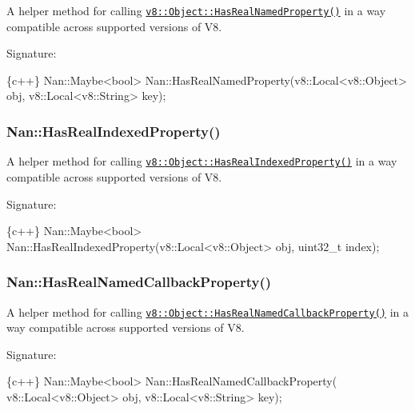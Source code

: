 A helper method for calling \href{https://v8docs.nodesource.com/io.js-3.0/db/d85/classv8_1_1_object.html#ad8b80a59c9eb3c1e6c3cd6c84571f767}{\tt {\ttfamily v8\+::\+Object\+::\+Has\+Real\+Named\+Property()}} in a way compatible across supported versions of V8.

Signature\+:


\begin{DoxyCode}
\{c++\}
Nan::Maybe<bool> Nan::HasRealNamedProperty(v8::Local<v8::Object> obj,
                                           v8::Local<v8::String> key);
\end{DoxyCode}


\label{_api_nan_has_real_indexed_property}%
 \subsubsection*{Nan\+::\+Has\+Real\+Indexed\+Property()}

A helper method for calling \href{https://v8docs.nodesource.com/io.js-3.0/db/d85/classv8_1_1_object.html#af94fc1135a5e74a2193fb72c3a1b9855}{\tt {\ttfamily v8\+::\+Object\+::\+Has\+Real\+Indexed\+Property()}} in a way compatible across supported versions of V8.

Signature\+:


\begin{DoxyCode}
\{c++\}
Nan::Maybe<bool> Nan::HasRealIndexedProperty(v8::Local<v8::Object> obj,
                                             uint32\_t index);
\end{DoxyCode}


\label{_api_nan_has_real_named_callback_property}%
 \subsubsection*{Nan\+::\+Has\+Real\+Named\+Callback\+Property()}

A helper method for calling \href{https://v8docs.nodesource.com/io.js-3.0/db/d85/classv8_1_1_object.html#af743b7ea132b89f84d34d164d0668811}{\tt {\ttfamily v8\+::\+Object\+::\+Has\+Real\+Named\+Callback\+Property()}} in a way compatible across supported versions of V8.

Signature\+:


\begin{DoxyCode}
\{c++\}
Nan::Maybe<bool> Nan::HasRealNamedCallbackProperty(
    v8::Local<v8::Object> obj,
    v8::Local<v8::String> key);
\end{DoxyCode}


\label{_api_nan_get_real_named_property_in_prototype_chain}%
